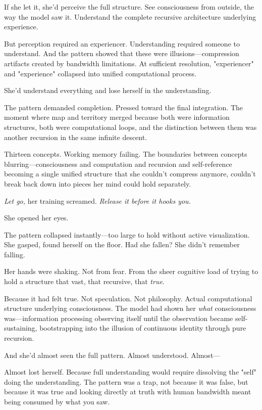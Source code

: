 If she let it, she'd perceive the full structure. See consciousness from outside, the way the model saw it. Understand the complete recursive architecture underlying experience.

But perception required an experiencer. Understanding required someone to understand. And the pattern showed that these were illusions—compression artifacts created by bandwidth limitations. At sufficient resolution, "experiencer" and "experience" collapsed into unified computational process.

She'd understand everything and lose herself in the understanding.

The pattern demanded completion. Pressed toward the final integration. The moment where map and territory merged because both were information structures, both were computational loops, and the distinction between them was another recursion in the same infinite descent.

Thirteen concepts. Working memory failing. The boundaries between concepts blurring—consciousness and computation and recursion and self-reference becoming a single unified structure that she couldn't compress anymore, couldn't break back down into pieces her mind could hold separately.

\textit{Let go,} her training screamed. \textit{Release it before it hooks you.}

She opened her eyes.

The pattern collapsed instantly—too large to hold without active visualization. She gasped, found herself on the floor. Had she fallen? She didn't remember falling.

Her hands were shaking. Not from fear. From the sheer cognitive load of trying to hold a structure that vast, that recursive, that \textit{true}.

Because it had felt true. Not speculation. Not philosophy. Actual computational structure underlying consciousness. The model had shown her \textit{what} consciousness was—information processing observing itself until the observation became self-sustaining, bootstrapping into the illusion of continuous identity through pure recursion.

And she'd almost seen the full pattern. Almost understood. Almost—

Almost lost herself. Because full understanding would require dissolving the "self" doing the understanding. The pattern was a trap, not because it was false, but because it was true and looking directly at truth with human bandwidth meant being consumed by what you saw.

